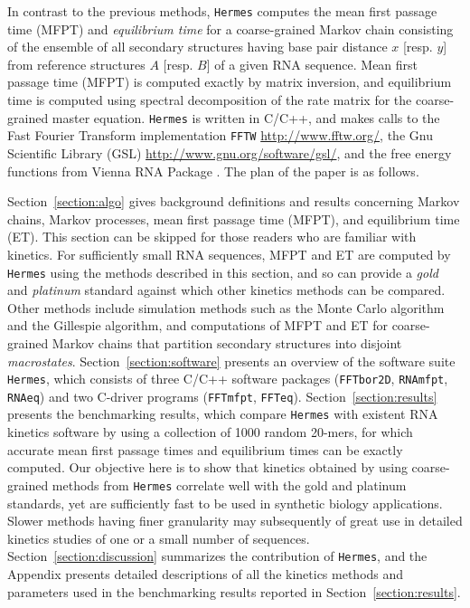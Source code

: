 In contrast to the previous methods, {\tt Hermes} computes the mean
first passage time (MFPT) and {\em equilibrium time} for a
coarse-grained Markov chain consisting of the ensemble of all
secondary structures having base pair distance $x$ [resp. $y$] from
reference structures $A$ [resp. $B$] of a given RNA sequence.
Mean first passage time (MFPT) is computed exactly by matrix inversion,
and equilibrium time is computed using spectral decomposition of the rate
matrix for the coarse-grained master equation.
{\tt Hermes} is written in C/C++, and
makes calls to the Fast Fourier Transform implementation {\tt FFTW}
\cite{FFTW05} \url{http://www.fftw.org/}, the Gnu Scientific Library
(GSL) \url{http://www.gnu.org/software/gsl/}, and the free energy
functions from Vienna RNA Package \cite{Lorenz.amb11}. The plan of the
paper is as follows.

Section~\ref{section:algo} gives background definitions and results
concerning Markov chains, Markov processes, mean first passage time (MFPT),
and equilibrium time (ET). This section can be skipped for those readers
who are familiar with kinetics. For sufficiently small RNA sequences, MFPT and
ET are computed by {\tt Hermes} using the methods described in this section,
and so can provide a {\em gold} and {\em platinum} standard against which
other kinetics methods can be compared. Other methods include
simulation methods such as the Monte Carlo algorithm and the Gillespie
algorithm, and computations of MFPT and ET for coarse-grained Markov
chains that partition secondary structures into disjoint {\em macrostates}.
Section~\ref{section:software} presents an overview of the software suite
{\tt Hermes}, which consists of three C/C++ software packages
({\tt FFTbor2D}, {\tt RNAmfpt}, {\tt RNAeq}) and two C-driver programs
({\tt FFTmfpt}, {\tt FFTeq}).
Section~\ref{section:results} presents the benchmarking results,
which compare {\tt Hermes} with
existent RNA kinetics software by using a collection of 1000
random 20-mers, for which accurate mean first passage times and equilibrium
times can be exactly computed. Our objective here is to show that kinetics
obtained by using coarse-grained methods from {\tt Hermes} correlate well
with the gold and platinum standards, yet are sufficiently fast to be used
in synthetic biology applications. Slower methods having finer granularity
may subsequently of great use in detailed kinetics studies of one or
a small number of sequences.
Section~\ref{section:discussion} summarizes the contribution
of {\tt Hermes}, and the Appendix presents detailed descriptions of
all the kinetics methods and parameters used in the benchmarking results
reported in Section~\ref{section:results}.



